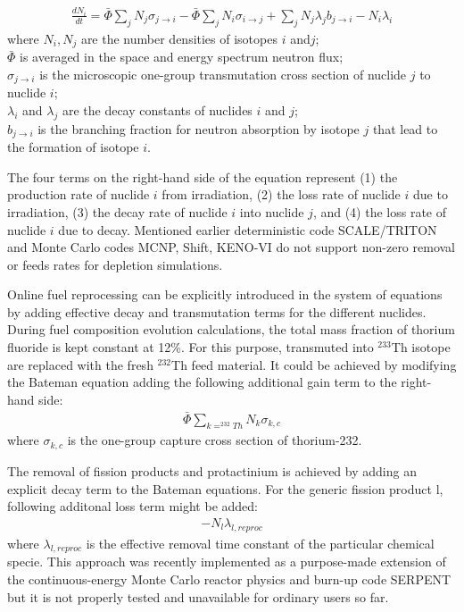 \begin{align*}
\frac{dN_i}{dt}=\bar{\Phi}\sum\limits_{j}N_{j}\sigma_{j \rightarrow i} - \bar{\Phi}\sum\limits_{j}N_{i}\sigma_{i \rightarrow j} + \sum\limits_{j}N_{j}\lambda_{j}b_{j \rightarrow i} - N_{i}\lambda_{i}
\end{align*}
where $N_i,N_j$ are the number densities of isotopes $i$ and$j$;\\
$\bar{\Phi}$ is averaged in the space and energy spectrum neutron flux;\\
$\sigma_{j \rightarrow i}$ is the microscopic one-group transmutation cross section of nuclide $j$ to nuclide $i$;\\
$\lambda_i$ and $\lambda_j$ are the decay constants of nuclides $i$ and $j$;\\
$b_{j \to i}$ is the branching fraction for neutron absorption by isotope $j$ that lead to the formation of isotope $i
$.

The four terms on the right-hand side of the equation represent (1) the production rate of nuclide $i$ from irradiation, (2) the loss rate of nuclide $i$ due to irradiation, (3) the decay rate of nuclide $i$ into nuclide $j$, and (4) the loss rate of nuclide $i$ due to decay. Mentioned earlier deterministic code SCALE/TRITON and Monte Carlo codes MCNP, Shift, KENO-VI do not support non-zero removal or feeds rates for depletion simulations.

Online fuel reprocessing can be explicitly introduced in the system of equations by adding effective decay and transmutation terms for the different nuclides. During fuel composition evolution calculations, the total mass fraction of thorium fluoride is kept constant at 12\%. For this purpose, transmuted into $^{233}$Th isotope are replaced with the fresh $^{232}$Th feed material. It could be achieved by modifying the Bateman equation adding the following additional gain term to the right-hand side:
\begin{align*}
\bar{\Phi}\sum\limits_{k=^{232}Th}N_{k}\sigma_{k,c}
\end{align*}
where $\sigma_{k,c}$ is the one-group capture cross section of thorium-232.

The removal of fission products and protactinium is achieved by adding an explicit decay term to the Bateman equations. For the generic fission product l, following additonal loss term might be added:
\begin{align*}
- N_{l}\lambda_{l,reproc}
\end{align*}
where $\lambda_{l,reproc}$ is the effective removal time constant of the particular chemical specie. This approach was recently implemented as a purpose-made extension of the continuous-energy Monte Carlo reactor physics and burn-up code SERPENT \cite{aufiero_extended_2013} but it is not properly tested and unavailable for ordinary users so far.

